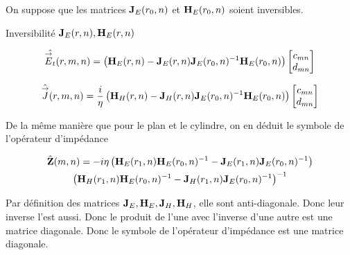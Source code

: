         On suppose que les matrices \(\mathbf{J}_{E}(r_0,n)\) et \(\mathbf{H}_{E}(r_0,n)\) soient inversibles.

        \begin{TODO}
          Inversibilité \(\mathbf{J}_{E}(r,n), \mathbf{H}_{E}(r,n)\)
        \end{TODO}

        \begin{equation}
            \hat{{\overset{\rightarrow}{E}}_t}(r,m,n) =
            \left(
                \mathbf{H}_{E}(r,n)
                -
                \mathbf{J}_{E}(r,n)
                \mathbf{J}_{E}(r_0,n)^{-1}
                \mathbf{H}_{E}(r_0,n)
            \right)
            \begin{bmatrix}
                c_{mn}
                \\
                d_{mn}
            \end{bmatrix}
        \end{equation}


        \begin{equation}
            \hat{{\overset{\rightarrow}{J}}}(r,m,n) = \dfrac{i}{\eta}
            \left(
                \mathbf{H}_{H}(r,n)
                -
                \mathbf{J}_{H}(r,n)
                \mathbf{J}_{E}(r_0,n)^{-1}
                \mathbf{H}_{E}(r_0,n)
            \right)
            \begin{bmatrix}
                c_{mn}
                \\
                d_{mn}
            \end{bmatrix}
        \end{equation}

        De la même manière que pour le plan et le cylindre, on en déduit le symbole de l'opérateur d'impédance

        \begin{multline}
            \hat{\mathbf{Z}}(m,n) = -i\eta
            \left(
                \mathbf{H}_{E}(r_1,n)
                \mathbf{H}_{E}(r_0,n)^{-1}
                -
                \mathbf{J}_{E}(r_1,n)
                \mathbf{J}_{E}(r_0,n)^{-1}
            \right)
            \\
            \left(
                \mathbf{H}_{H}(r_1,n)
                \mathbf{H}_{E}(r_0,n)^{-1}
                -
                \mathbf{J}_{H}(r_1,n)
                \mathbf{J}_{E}(r_0,n)^{-1}
            \right)^{-1}
        \end{multline}

        Par définition des matrices \(\mathbf{J}_E,\mathbf{H}_E,\mathbf{J}_H,\mathbf{H}_H\), elle sont anti-diagonale. Donc leur inverse l'est aussi. Donc le produit de l'une avec l'inverse d'une autre est une matrice diagonale. Donc le symbole de l'opérateur d'impédance est une matrice diagonale.

